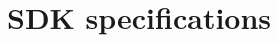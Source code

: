 \documentclass[openright,twoside,11pt]{book}
\begin{document}

\FloatBarrier

\FloatBarrier

\FloatBarrier

\chapter{\urbi SDK specifications}
\label{sec:sdk}

\clearpage
{} %
\printindex
\end{document}
